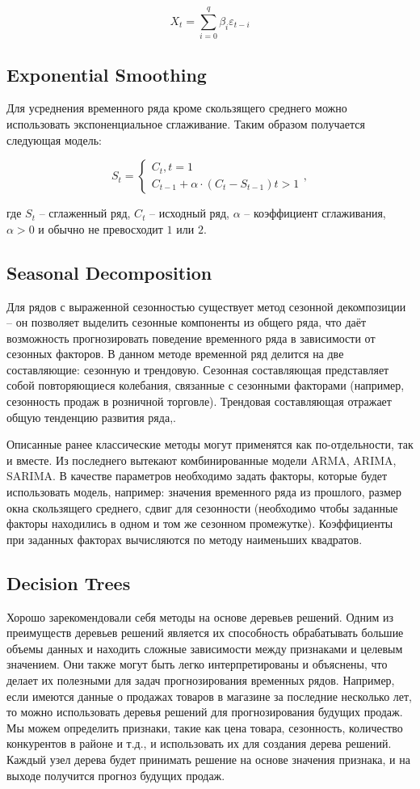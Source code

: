 \documentclass[diploma]{nanolab2015}
\begin{document}
$$
    X_t = \sum_{i=0}^{q}\beta_i \varepsilon_{t-i}
$$

\subsection{Exponential Smoothing}
Для усреднения временного ряда кроме скользящего среднего можно использовать экспоненциальное сглаживание. Таким образом получается следующая модель\cite{book2}:

$$
    S_t =
    \begin{cases}
        C_t, t = 1 \\
        C_{t-1} + \alpha \cdot (C_t - S_{t-1}) t > 1
    \end{cases},
$$

где $S_t$ -- сглаженный ряд, $C_t$ -- исходный ряд, $\alpha$ -- коэффициент сглаживания, $\alpha > 0$ и обычно не превосходит $1$ или $2$.

\subsection{Seasonal Decomposition}
Для рядов с выраженной сезонностью существует метод сезонной декомпозиции -- он позволяет выделить сезонные компоненты из общего ряда, что даёт возможность прогнозировать поведение временного ряда в зависимости от сезонных факторов. В данном методе временной ряд делится на две составляющие: сезонную и трендовую. Сезонная составляющая представляет собой повторяющиеся колебания, связанные с сезонными факторами (например, сезонность продаж в розничной торговле). Трендовая составляющая отражает общую тенденцию развития ряда\cite{book3},\cite{book4}.

Описанные ранее классические методы могут применятся как по-отдельности, так и вместе. Из последнего вытекают комбинированные модели ARMA, ARIMA, SARIMA. В качестве параметров необходимо задать факторы, которые будет использовать модель, например: значения временного ряда из прошлого, размер окна скользящего среднего, сдвиг для сезонности (необходимо чтобы заданные факторы находились в одном и том же сезонном промежутке). Коэффициенты при заданных факторах вычисляются по методу наименьших квадратов\cite{book5}.

\subsection{Decision Trees}
Хорошо зарекомендовали себя методы на основе деревьев решений. Одним из преимуществ деревьев решений является их способность обрабатывать большие объемы данных и находить сложные зависимости между признаками и целевым значением. Они также могут быть легко интерпретированы и объяснены, что делает их полезными для задач прогнозирования временных рядов. Например, если имеются данные о продажах товаров в магазине за последние несколько лет, то можно использовать деревья решений для прогнозирования будущих продаж. Мы можем определить признаки, такие как цена товара, сезонность, количество конкурентов в районе и т.д., и использовать их для создания дерева решений. Каждый узел дерева будет принимать решение на основе значения признака, и на выходе получится прогноз будущих продаж.
\end{document}
